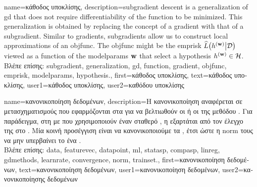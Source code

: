 {name={\foreignlanguage{greek}{κάθοδος υποκλίσης}}, 
	description={\Gls{subgradient} 
		descent is a \gls{generalization} of \gls{gd} that does not require differentiability of the 
		\gls{function} to be minimized. This \gls{generalization} is obtained by replacing the concept 
		of a \gls{gradient} with that of a \gls{subgradient}. Similar to \gls{gradient}s, \gls{subgradient}s 
		allow us to construct local approximations of an \gls{objfunc}. The \gls{objfunc} 
		might be the \gls{emprisk} $\widehat{L}\big( h^{({\bf w})} \big| \mathcal{D} \big)$ viewed 
		as a \gls{function} of the \glspl{modelparam} ${\bf w}$ that select a \gls{hypothesis} $h^{({\bf w})} \in \mathcal{H}$.\\
		\foreignlanguage{greek}{Βλέπε επίσης:} \gls{subgradient}, \gls{generalization}, \gls{gd}, \gls{function}, \gls{gradient}, 
		\gls{objfunc}, \gls{emprisk}, \glspl{modelparam}, \gls{hypothesis}.},
	first={\foreignlanguage{greek}{κάθοδος υποκλίσης}},
	text={\foreignlanguage{greek}{κάθοδος υποκλίσης}},
	user1={\foreignlanguage{greek}{κάθοδος υποκλίσης}}, %
	user2={\foreignlanguage{greek}{καθόδου υποκλίσης}} %
}

{name={\foreignlanguage{greek}{κανονικοποίηση δεδομένων}},
	description={\foreignlanguage{greek}{Η κανονικοποίηση}  
		\foreignlanguage{greek}{αναφέρεται σε μετασχηματισμούς που εφαρμόζονται στα}   
		\foreignlanguage{greek}{για να βελτιωθούν οι}  \foreignlanguage{greek}{ή οι}  
		\foreignlanguage{greek}{της μεθόδου} . \foreignlanguage{greek}{Για παράδειγμα, στη}  
		\foreignlanguage{greek}{με}  \foreignlanguage{greek}{που χρησιμοποιούν έναν σταθερό}
		, \foreignlanguage{greek}{η}  \foreignlanguage{greek}{εξαρτάται από τον έλεγχο της} 
		  \foreignlanguage{greek}{στο} . \foreignlanguage{greek}{Μία κοινή 
		προσέγγιση είναι να κανονικοποιούμε τα} , \foreignlanguage{greek}{έτσι ώστε η} 
		\gls{norm} \foreignlanguage{greek}{τους να μην υπερβαίνει το ένα} \cite[\foreignlanguage{greek}{Κεφ.}\ 5]{MLBasics}.\\
		\foreignlanguage{greek}{Βλέπε επίσης:} \gls{data}, \gls{featurevec}, \gls{datapoint}, \gls{ml}, \gls{statasp}, \gls{compasp}, 
		\gls{linreg}, \gls{gdmethods}, \gls{learnrate}, \gls{convergence}, \gls{norm}, \gls{trainset}.},
	first={\foreignlanguage{greek}{κανονικοποίηση δεδομένων}},
	text={\foreignlanguage{greek}{κανονικοποίηση δεδομένων}},
	user1={\foreignlanguage{greek}{κανονικοποίηση δεδομένων}}, %
  	user2={\foreignlanguage{greek}{κανονικοποίησης δεδομένων}} %
}

